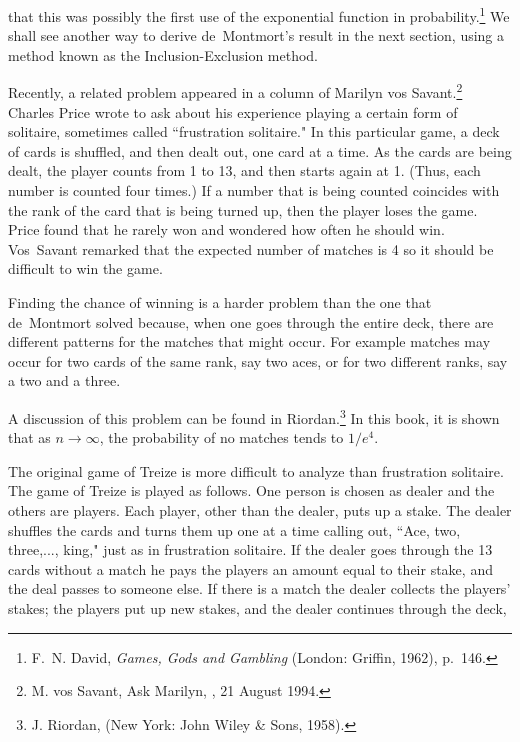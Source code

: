 that this was possibly the first use of the exponential function in
probability.\footnote{F.~N. David, {\em Games, Gods and Gambling} (London: Griffin,
1962), p.~146.}  We shall see another way to derive de~Montmort's result in the next
section, using a method known as the Inclusion-Exclusion method.
\par
Recently, a related problem appeared in a column of Marilyn vos Savant.\footnote{M.
vos Savant, Ask Marilyn, , 21
August 1994.}  Charles Price wrote to ask about his experience
playing a certain form of solitaire, sometimes called ``frustration solitaire."  In this particular game, a deck of cards is shuffled, and then dealt out, one card at a
time.  As the cards are being dealt, the player counts from 1 to 13, and then starts again at 1. 
(Thus, each number is counted four times.) If a number that is being counted coincides with the rank
of the card that is  being turned up, then the player loses the game.  Price found that he rarely
won and wondered how often he should win. Vos~Savant remarked that the expected number of matches is
4 so it should be difficult to win the game.
\par
Finding the chance of winning is a harder problem than the one that de~Montmort solved
because, when one goes through the entire deck, there are different
patterns for the matches that might occur. For example matches may occur for
two cards of the same rank, say two aces, or for two different ranks, say a two and
a three.
\par
A discussion of this problem can be found in Riordan.\footnote{J. Riordan,  (New York: John Wiley \& Sons, 1958).} In
this book, it is shown that as $n \rightarrow \infty$, the probability of no matches tends to
$1/e^4$.
\par
The original game of Treize is more difficult to analyze than frustration solitaire.
The game of Treize is played as follows.  One person is chosen as dealer and the 
others are players. Each player, other than the dealer, puts up a stake. The dealer shuffles the
cards and turns them  up one at a time calling out, ``Ace, two, three,..., king," just as in
frustration solitaire. If the dealer goes through the 13 cards without a match he pays
the players an amount equal to their stake, and the deal passes to someone
else. If there is a match the dealer collects the players' stakes; the
players put up new stakes, and the dealer continues through the deck,
